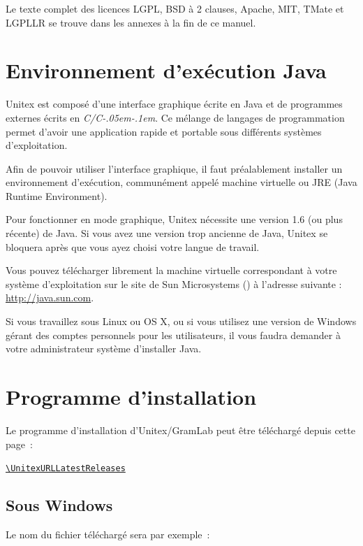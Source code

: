 \bigskip
\noindent Le texte complet des licences LGPL, BSD à 2 clauses, Apache, MIT, TMate et LGPLLR
se trouve dans les annexes à la fin de ce manuel.

\section{Environnement d’exécution Java}
Unitex est composé d’une interface graphique écrite en Java et de programmes externes
écrits en \textit{C/C\kern-.05em\raisebox{.5ex}{++}\kern-.1em}. Ce mélange de langages de 
programmation permet d’avoir une application rapide et portable sous différents systèmes d’exploitation.


\bigskip
\noindent Afin de pouvoir utiliser l’interface graphique, il faut préalablement installer
un environnement d’exécution, communément appelé machine virtuelle  ou
JRE (Java Runtime Environment).

\bigskip
\noindent Pour fonctionner en mode graphique, Unitex nécessite une version 1.6 (ou plus récente)
de Java. Si vous avez une version trop ancienne de Java, Unitex se bloquera après que vous
ayez choisi votre langue de travail.


\bigskip
\noindent Vous pouvez télécharger librement la machine virtuelle correspondant à votre 
système d’exploitation sur le site de Sun Microsystems (\cite{site-java}) à l’adresse suivante : 
\url{http://java.sun.com}.

\bigskip
\noindent Si vous travaillez sous Linux ou OS X, ou si vous
utilisez une version de Windows gérant des comptes personnels pour les utilisateurs, il vous
faudra demander à votre administrateur système d’installer Java.


\section{Programme d'installation}
\begin{samepage}
Le programme d'installation d'Unitex/GramLab peut être téléchargé depuis cette page~:

\begin{center}
{\tt\url{\UnitexURLLatestReleases}}
\end{center}
\end{samepage}

\subsection{Sous Windows}
Le nom du fichier téléchargé sera par exemple~:


